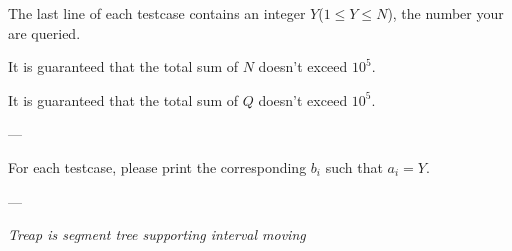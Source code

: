 The last line of each testcase contains an integer $Y$($1\leq Y\leq N$), the number your are queried.

It is guaranteed that the total sum of $N$ doesn't exceed $10^5$.

It is guaranteed that the total sum of $Q$ doesn't exceed $10^5$.

---


For each testcase, please print the corresponding $b_i$ such that $a_i = Y$.

---


\begin{center}
\textit{Treap is segment tree supporting interval moving}
\end{center}